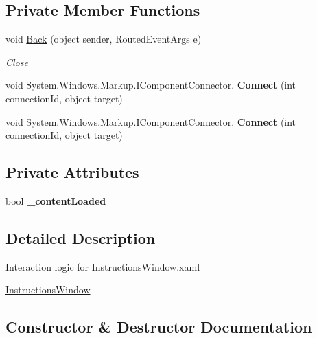 \subsection*{Private Member Functions}
\begin{DoxyCompactItemize}
\item 
void \mbox{\hyperlink{class_bomberman_1_1_u_i_1_1_instructions_window_a26a3f78a5537e22bc7a35cce5f37caa7}{Back}} (object sender, Routed\+Event\+Args e)
\begin{DoxyCompactList}\small\item\em Close \end{DoxyCompactList}\item 
\mbox{\label{class_bomberman_1_1_u_i_1_1_instructions_window_ac0febc04aac94611373963723270bca8}} 
void System.\+Windows.\+Markup.\+I\+Component\+Connector. {\bfseries Connect} (int connection\+Id, object target)
\item 
\mbox{\label{class_bomberman_1_1_u_i_1_1_instructions_window_ac0febc04aac94611373963723270bca8}} 
void System.\+Windows.\+Markup.\+I\+Component\+Connector. {\bfseries Connect} (int connection\+Id, object target)
\end{DoxyCompactItemize}
\subsection*{Private Attributes}
\begin{DoxyCompactItemize}
\item 
\mbox{\label{class_bomberman_1_1_u_i_1_1_instructions_window_a6a242653e4c094ec139b9a833752bf87}} 
bool {\bfseries \+\_\+content\+Loaded}
\end{DoxyCompactItemize}


\subsection{Detailed Description}
Interaction logic for Instructions\+Window.\+xaml 

\mbox{\hyperlink{class_bomberman_1_1_u_i_1_1_instructions_window}{Instructions\+Window}}

\subsection{Constructor \& Destructor Documentation}
\mbox{\label{class_bomberman_1_1_u_i_1_1_instructions_window_a5a53ea22baa08345e54cf6589f770381}} 
